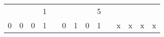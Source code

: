 \documentclass{beamer}
\begin{document}
\begin{frame}
{\begin{center}
\begin{tabular}{|c|c|c|c|c|c|c|c|c|c|c|c|c|c|}
				\cline{1-4} \cline{6-9} \cline{11-14}
			\end{tabular}
		\end{center}}
		\only<6>
		{\begin{center}
			\def\arraystretch{1.5}
			\begin{tabular}{|c|c|c|c|c|c|c|c|c|c|c|c|c|c|}
				\multicolumn{3}{c}{}&\multicolumn{1}{c}{1}&\multicolumn{4}{c}{}&\multicolumn{1}{c}{5}&\multicolumn{4}{c}{}\\
				\cline{1-4} \cline{6-9} \cline{11-14}
				0&0&0&1&&0&1&0&1&&x&x&x&x\\
				\cline{1-4} \cline{6-9} \cline{11-14}
			\end{tabular}
		\end{center}}

	\end{frame}
		
\end{document}
